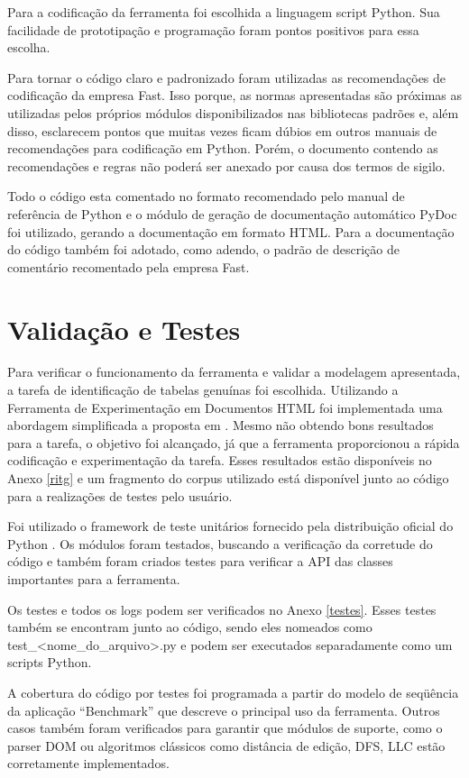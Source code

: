 \documentclass[12pt, a4paper]{article}
\begin{document}
Para a codificação da ferramenta foi escolhida a linguagem script
Python. Sua facilidade de prototipação e programação foram pontos
positivos para essa escolha.

Para tornar o código claro e padronizado foram utilizadas as
recomendações de codificação da empresa Fast.
Isso porque, as normas apresentadas são próximas as utilizadas pelos 
próprios módulos disponibilizados nas bibliotecas padrões e, além disso,
esclarecem pontos que muitas vezes ficam dúbios em outros manuais de 
recomendações para codificação em Python. Porém,
  o documento contendo as recomendações e regras não
  poderá ser anexado por causa dos termos de sigilo. 

Todo o código esta comentado no formato recomendado pelo manual de
referência de Python e o  módulo de geração de documentação automático
PyDoc foi utilizado, gerando a documentação em formato HTML. Para a
documentação do código também foi adotado, como adendo, o padrão de 
descrição de comentário recomentado pela empresa Fast.

\section{Validação e Testes}

Para verificar o funcionamento da ferramenta e validar a modelagem apresentada,
a tarefa de identificação de tabelas genuínas foi escolhida. Utilizando a
Ferramenta de Experimentação em Documentos HTML foi implementada uma abordagem
simplificada a proposta em \cite{LGZ2003}. Mesmo não obtendo bons resultados
para a tarefa, o objetivo foi alcançado, já que a ferramenta proporcionou a
rápida codificação e experimentação da tarefa. Esses resultados estão
disponíveis no Anexo \ref{ritg} e um fragmento do corpus utilizado está disponível junto ao código para a realizações de testes pelo usuário.

Foi utilizado o framework de teste unitários fornecido pela distribuição
oficial do Python \cite{UTest}. Os módulos foram testados, buscando a verificação
da corretude do código e também foram criados testes para verificar a
API das classes importantes para a ferramenta.

Os testes e todos os logs podem ser verificados no Anexo \ref{testes}. Esses testes
também se encontram junto ao código, sendo eles nomeados como
test\_<nome\_do\_arquivo>.py e podem ser executados separadamente como
um scripts Python.

A cobertura do código por testes foi programada a partir do modelo de
seqüência da aplicação ``Benchmark'' que descreve o principal uso da
ferramenta. Outros casos também foram verificados para garantir que
módulos de suporte, como o parser DOM ou algoritmos clássicos como
distância de edição, DFS, LLC estão corretamente
implementados.
\end{document}
